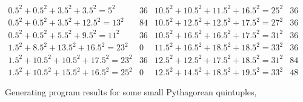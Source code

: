 \documentclass[12pt]{article}
\theoremstyle{definition}
\numberwithin{equation}{section}
\begin{document}
\begin{appendices}
\begin{figure}
$$\begin{array}{l|c||l|c}
%
0.5^2+ 0.5^2+ 3.5^2+ 3.5^2  = 5^2 &36&
10.5^2+ 10.5^2+ 11.5^2+ 16.5^2  = 25^2 &36\\
%
0.5^2+ 0.5^2+ 3.5^2+ 12.5^2  = 13^2 &84&
10.5^2+ 12.5^2+ 12.5^2+ 17.5^2  = 27^2 &36\\
%
0.5^2+ 0.5^2+ 5.5^2+ 9.5^2  = 11^2 &36&
10.5^2+ 16.5^2+ 16.5^2+ 17.5^2  = 31^2 &36\\
%
1.5^2+ 8.5^2+ 13.5^2+ 16.5^2  = 23^2 &0&
11.5^2+ 16.5^2+ 18.5^2+ 18.5^2  = 33^2 &36\\
%
1.5^2+ 10.5^2+ 10.5^2+ 17.5^2  = 23^2 &36&
12.5^2+ 12.5^2+ 17.5^2+ 18.5^2  = 31^2 &84\\
%
1.5^2+ 10.5^2+ 15.5^2+ 16.5^2  = 25^2 &0&
12.5^2+ 14.5^2+ 18.5^2+ 19.5^2  = 33^2 &48
\end{array}
$$
\caption{Generating program results for some small Pythagorean quintuples,}
\label{figure_quintuples}
\end{figure}



\end{appendices}
\end{document}
